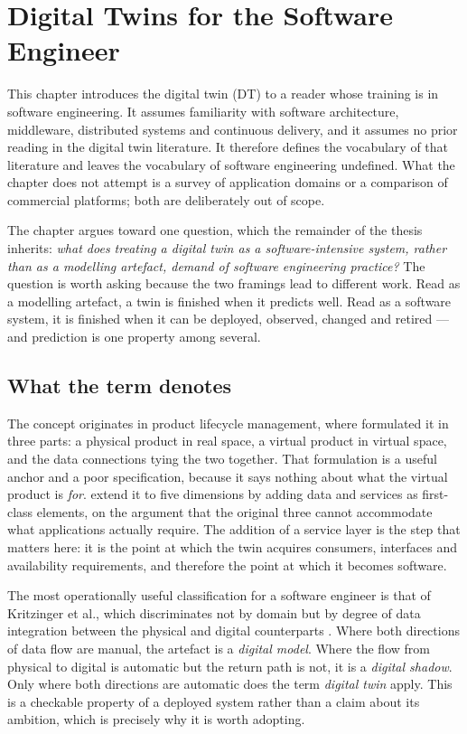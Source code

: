 \chapter{Digital Twins for the Software Engineer}
\label{ch:dt-intro}

This chapter introduces the digital twin (DT) to a reader whose training is in
software engineering. It assumes familiarity with software architecture,
middleware, distributed systems and continuous delivery, and it assumes no
prior reading in the digital twin literature. It therefore defines the
vocabulary of that literature and leaves the vocabulary of software
engineering undefined. What the chapter does not attempt is a survey of
application domains or a comparison of commercial platforms; both are
deliberately out of scope.

The chapter argues toward one question, which the remainder of the thesis
inherits: \emph{what does treating a digital twin as a software-intensive
system, rather than as a modelling artefact, demand of software engineering
practice?} The question is worth asking because the two framings lead to
different work. Read as a modelling artefact, a twin is finished when it
predicts well. Read as a software system, it is finished when it can be
deployed, observed, changed and retired --- and prediction is one property
among several.

\section{What the term denotes}
\label{sec:dt-intro:denotation}

The concept originates in product lifecycle management, where
\citet{grieves_digital_2017} formulated it in three parts: a physical product
in real space, a virtual product in virtual space, and the data connections
tying the two together. That formulation is a useful anchor and a poor
specification, because it says nothing about what the virtual product is
\emph{for}. \citet{tao_five-dimension_2019} extend it to five dimensions by
adding data and services as first-class elements, on the argument that the
original three cannot accommodate what applications actually require. The
addition of a service layer is the step that matters here: it is the point at
which the twin acquires consumers, interfaces and availability requirements,
and therefore the point at which it becomes software.

The most operationally useful classification for a software engineer is that of
Kritzinger et al., which discriminates not by domain but by degree of data
integration between the physical and digital counterparts
\citep{kritzinger_digital_2018}. Where both directions of data flow are
manual, the artefact is a \emph{digital model}. Where the flow from physical
to digital is automatic but the return path is not, it is a \emph{digital
shadow}. Only where both directions are automatic does the term
\emph{digital twin} apply. This is a checkable property of a deployed system
rather than a claim about its ambition, which is precisely why it is worth
adopting.

